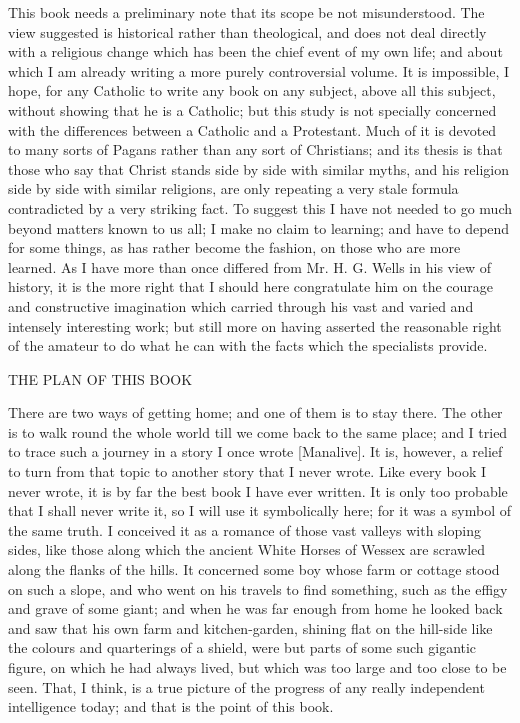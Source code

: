 
This book needs a preliminary note that its scope be not misunderstood. The view suggested is historical rather than theological, and does not deal directly with a religious change which has been the chief event of my own life; and about which I am already writing a more purely controversial volume. It is impossible, I hope, for any Catholic to write any book on any subject, above all this subject, without showing that he is a Catholic; but this study is not specially concerned with the differences between a Catholic and a Protestant. Much of it is devoted to many sorts of Pagans rather than any sort of Christians; and its thesis is that those who say that Christ stands side by side with similar myths, and his religion side by side with similar religions, are only repeating a very stale formula contradicted by a very striking fact. To suggest this I have not needed to go much beyond matters known to us all; I make no claim to learning; and have to depend for some things, as has rather become the fashion, on those who are more learned. As I have more than once differed from Mr. H. G. Wells in his view of history, it is the more right that I should here congratulate him on the courage and constructive imagination which carried through his vast and varied and intensely interesting work; but still more on having asserted the reasonable right of the amateur to do what he can with the facts which the specialists provide.


THE PLAN OF THIS BOOK

There are two ways of getting home; and one of them is to stay there. The other is to walk round the whole world till we come back to the same place; and I tried to trace such a journey in a story I once wrote [Manalive]. It is, however, a relief to turn from that topic to another story that I never wrote. Like every book I never wrote, it is by far the best book I have ever written. It is only too probable that I shall never write it, so I will use it symbolically here; for it was a symbol of the same truth. I conceived it as a romance of those vast valleys with sloping sides, like those along which the ancient White Horses of Wessex are scrawled along the flanks of the hills. It concerned some boy whose farm or cottage stood on such a slope, and who went on his travels to find something, such as the effigy and grave of some giant; and when he was far enough from home he looked back and saw that his own farm and kitchen-garden, shining flat on the hill-side like the colours and quarterings of a shield, were but parts of some such gigantic figure, on which he had always lived, but which was too large and too close to be seen. That, I think, is a true picture of the progress of any really independent intelligence today; and that is the point of this book.

